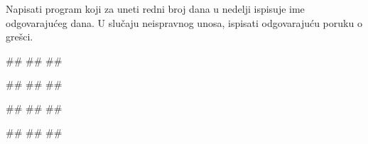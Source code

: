 \begin{Exercise}[label=KT_NG_23] 
 Napisati program koji za uneti redni broj dana u nedelji ispisuje ime odgovarajućeg dana. 
U slučaju neispravnog unosa, ispisati odgovarajuću poruku o grešci.

\begin{miditest}
\begin{upotreba}{1}
#\naslovInt#
##
##
\end{upotreba}
\end{miditest}
\begin{miditest}
\begin{upotreba}{2}
#\naslovInt#
##
##
\end{upotreba}
\end{miditest}

\begin{miditest}
\begin{upotreba}{3}
#\naslovInt#
##
##
\end{upotreba}
\end{miditest}
\begin{miditest}
\begin{upotreba}{4}
#\naslovInt#
##
##
\end{upotreba}
\end{miditest}

\end{Exercise}
\ifresenja
 \begin{Answer}[ref=KT_NG_23]
\end{Answer}
\fi


